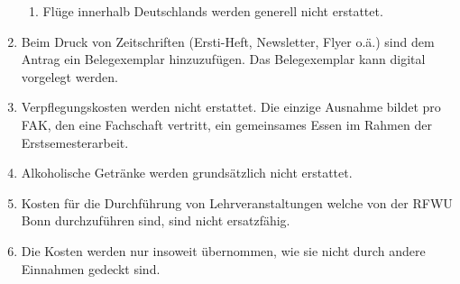\documentclass{article}
\begin{document}
\begin{enumerate}[(1)]
\begin{enumerate}[1.]
        \item Flüge innerhalb Deutschlands werden generell nicht erstattet.   
    \end{enumerate}
    \item Beim Druck von Zeitschriften (Ersti-Heft, Newsletter, Flyer o.ä.) sind dem Antrag ein Belegexemplar hinzuzufügen. 
    	Das Belegexemplar kann digital vorgelegt werden.
    \item Verpflegungskosten werden nicht erstattet. 
    	Die einzige Ausnahme bildet pro FAK, den eine Fachschaft vertritt, ein gemeinsames Essen im Rahmen der Erstsemesterarbeit. 
    \item Alkoholische Getränke werden grundsätzlich nicht erstattet.
    \item Kosten für die Durchführung von Lehrveranstaltungen welche von der RFWU Bonn durchzuführen sind, sind nicht ersatzfähig.
    \item Die Kosten  werden nur insoweit übernommen, wie sie nicht durch andere Einnahmen gedeckt sind.
\end{enumerate}
\end{document}

